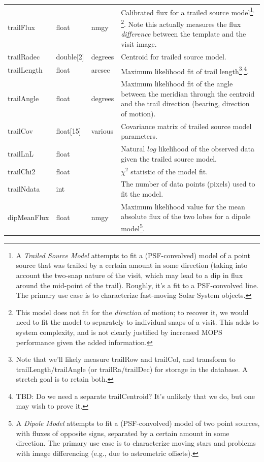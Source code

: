 \documentclass[12pt]{article}
\begin{document}
\begin{center}
\begin{longtable}{p{3cm}p{2cm}p{2cm}p{5cm}}
trailFlux & float & nmgy & Calibrated flux for a trailed source model\footnote{A \emph{Trailed Source Model} attempts to fit a (PSF-convolved) model of a point source that was trailed by a certain amount in some direction (taking into account the two-snap nature of the visit, which may lead to a dip in flux around the mid-point of the trail). Roughly, it's a fit to a PSF-convolved line. The primary use case is to characterize fast-moving Solar System objects.}$^,$\footnote{This model does not fit for the \emph{direction} of motion; to recover it, we would need to fit the model to separately to individual snaps of a visit. This adds to system complexity, and is not clearly justified by increased MOPS performance given the added information.}. Note this actually measures the flux \emph{difference} between the template and the visit image. \\

trailRadec & double[2] & degrees & Centroid for trailed source model. \\

trailLength & float & arcsec & Maximum likelihood fit of trail length\footnote{Note that we'll likely measure trailRow and trailCol, and transform to trailLength/trailAngle (or trailRa/trailDec) for storage in the database. A stretch goal is to retain both.}$^,$\footnote{TBD: Do we need a separate trailCentroid? It's unlikely that we do, but one may wish to prove it.}. \\

trailAngle & float & degrees & Maximum likelihood fit of the angle between the meridian through the centroid and the trail direction (bearing, direction of motion). \\

trailCov & float[15] & various & Covariance matrix of trailed source model parameters. \\

trailLnL & float & ~ & Natural $log$ likelihood of the observed data given the trailed source model. \\

trailChi2 & float & ~ & $\chi^2$ statistic of the model fit. \\

trailNdata & int & ~ & The number of data points (pixels) used to fit the model. \\

dipMeanFlux & float & nmgy & Maximum likelihood value for the mean absolute flux of the two lobes for a dipole model\footnote{A \emph{Dipole Model} attempts to fit a (PSF-convolved) model of two point sources, with fluxes
of opposite signs, separated by a certain amount in some direction. The primary use case is to characterize moving stars and problems with image differencing (e.g., due to astrometric offsets).}.
\\


\end{longtable}
\end{center}
\end{document}
